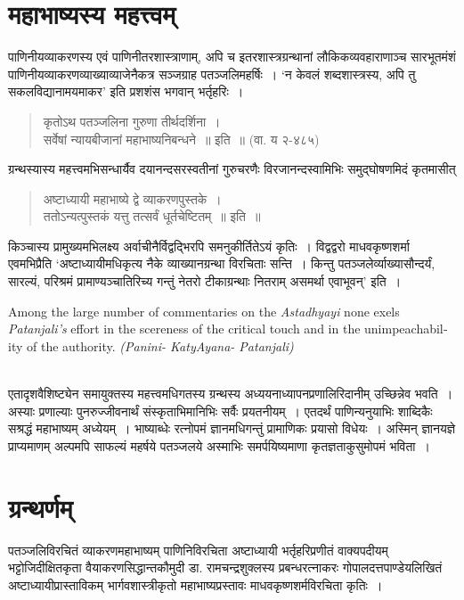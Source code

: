 {\section*{महाभाष्यस्य महत्त्वम्}

पाणिनीयव्याकरणस्य एवं पाणिनीतरशास्त्राणाम्, अपि च इतरशास्त्रग्रन्थानां लौकिक\-व्यवहाराणाञ्च सारभूतमंशं पाणिनीयव्याकरणव्याख्याव्याजेनैकत्र सञ्जग्राह पतञ्जलिमहर्षिः~। ‘न केवलं शब्दशास्त्रस्य, अपि तु सकलविद्यानामयमाकर’ इति प्रशशंस भगवान् भर्तृहरिः~। 
\begin{verse}
कृतोऽथ पतञ्जलिना गुरुणा तीर्थदर्शिना~। \\
सर्वेषां न्यायबीजानां महाभाष्यनिबन्धने~॥ इति~॥ (वा. य २-४८५)
\end{verse}
ग्रन्थस्यास्य महत्त्वमभिसन्धार्यैव दयानन्दसरस्वतीनां गुरुचरणैः विरजानन्दस्वामिभिः \-समुद्घोषणमिदं कृतमासीत् 
\begin{verse}
अष्टाध्यायी महाभाष्ये द्वे व्याकरणपुस्तके~। \\
ततोऽन्यत्पुस्तकं यत्तु तत्सर्वं धूर्तचेष्टितम्~॥ इति~॥
\end{verse}

किञ्चास्य प्रामुख्यमभिलक्ष्य अर्वाचीनैर्विद्वद्भिरपि समनुकीर्तितेऽयं कृतिः~। विद्वद्वरो माधवकृष्णशर्मा एवमभिप्रैति ‘अष्टाध्यायीमधिकृत्य नैके व्याख्यानग्रन्था विरचिताः सन्ति~। किन्तु पतञ्जलेर्व्याख्यासौन्दर्यं, सारल्यं, परिश्रमं प्रामाण्यञ्चातिरिच्य गन्तुं नेतरो टीकाग्रन्थाः नितराम् असमर्था एवाभूवन्’ इति~। 
\begin{english}
{\fontsize{12}{14}\selectfont
Among the large number of commentaries on the \textit{Astadhyayi} none exels \textit{Patanjali’s} effort in the scereness of the critical touch and in the unimpeachability of the authority. \textit{(Panini- KatyAyana- Patanjali)}}
\end{english}
~\\[0.1cm]
एतादृशवैशिष्ट्येन समायुक्तस्य महत्त्वमधिगतस्य ग्रन्थस्य अध्ययनाध्यापनप्रणा\-लिरिदानीम् उच्छिन्नेव भवति~। अस्याः प्रणाल्याः पुनरुज्जीवनार्थं संस्कृताभिमानिभिः सर्वैः प्रयतनीयम्~। एतदर्थं पाणिन्यनुयाभिः शाब्दिकैः सश्रद्धं महाभाष्यम् अध्येयम्~। भाष्याब्धेः रत्नोपमं ज्ञानमधिगन्तुं प्रामाणिकः प्रयासो विधेयः~। अस्मिन् ज्ञानयज्ञे प्राप्यमाणम् अल्पमपि साफल्यं महर्षये पतञ्जलये अस्माभिः समर्पयिष्यमाणा कृतज्ञताकुसुमोपमं भविता~। 

\section*{ग्रन्थर्णम्}
\vskip -20pt

\begin{thebibliography}{99}
 पतञ्जलिविरचितं व्याकरणमहाभाष्यम्
 पाणिनिविरचिता अष्टाध्यायी
 भर्तृहरिप्रणीतं वाक्यपदीयम्
 भट्टोजिदीक्षितकृता वैयाकरणसिद्धान्तकौमुदी
 डा. रामचन्द्रशुक्लस्य प्रबन्धरत्नाकरः
 गोपालदत्तपाण्डेयलिखितं अष्टाध्यायीप्रास्ताविकम्
 भार्गवशास्त्रीकृतो महाभाष्यप्रस्तावः
 माधवकृष्णशर्मविरचिता {\fontsize{12}{14}\selectfont{}} कृतिः~। 
\end{thebibliography}
\articleend
}
